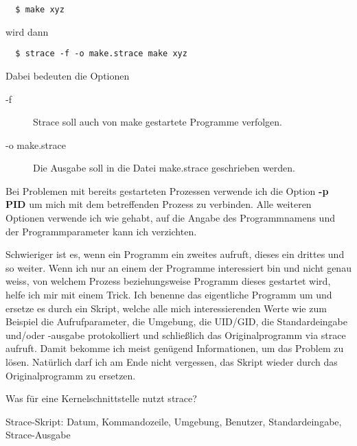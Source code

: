 \begin{normaltext}
  \begin{verbatim}
  $ make xyz
  \end{verbatim}

  wird dann

  \begin{verbatim}
  $ strace -f -o make.strace make xyz
  \end{verbatim}

  Dabei bedeuten die Optionen

  \begin{description}
    \item[-f] Strace soll auch von make gestartete Programme verfolgen.
    \item[-o make.strace] Die Ausgabe soll in die Datei make.strace
      geschrieben werden.
  \end{description}

  Bei Problemen mit bereits gestarteten Prozessen verwende ich die Option
  {\bf -p PID} um mich mit dem betreffenden Prozess zu verbinden. Alle
  weiteren Optionen verwende ich wie gehabt, auf die Angabe des Programmnamens
  und der Programmparameter kann ich verzichten.

  Schwieriger ist es, wenn ein Programm ein zweites aufruft, dieses ein
  drittes und so weiter. Wenn ich nur an einem der Programme interessiert bin
  und nicht genau weiss, von welchem Prozess beziehungsweise Programm dieses
  gestartet wird, helfe ich mir mit einem Trick. Ich benenne das eigentliche
  Programm um und ersetze es durch ein Skript, welche alle mich
  interessierenden Werte wie zum Beispiel die Aufrufparameter, die Umgebung,
  die UID/GID, die Standardeingabe und/oder -ausgabe protokolliert und
  schließlich das Originalprogramm via strace aufruft.
  Damit bekomme ich meist genügend Informationen, um das Problem zu lösen.
  Natürlich darf ich am Ende nicht vergessen, das Skript wieder durch das
  Originalprogramm zu ersetzen.
\end{normaltext}

\begin{notes}
\item Was für eine Kernelschnittstelle nutzt strace?
\item Strace-Skript: Datum, Kommandozeile, Umgebung, Benutzer,
  Standardeingabe, Strace-Ausgabe
\end{notes}


